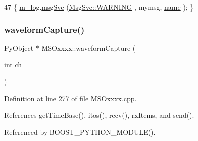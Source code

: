 \begin{DoxyCode}
47 \{ \hyperlink{classObject_a0d269813dd7ac1f24bc143031e2963f2}{m\_log}.\hyperlink{classMsgSvc_ad25f18047920cc59a314e5098259711c}{msgSvc} (\hyperlink{classMsgSvc_ae671eb7301996cd049d2da8a65925926a7cefae88f2ba26b2b05b676a383c834b}{MsgSvc::WARNING} , mymsg, \hyperlink{classObject_a300f4c05dd468c7bb8b3c968868443c1}{name} ); \}
\end{DoxyCode}
\mbox{\label{classMSOxxxx_aed78c680bcec9e14a88eedf7b291518c}} 
\subsubsection{\texorpdfstring{waveform\+Capture()}{waveformCapture()}}
{\footnotesize\ttfamily Py\+Object $\ast$ M\+S\+Oxxxx\+::waveform\+Capture (\begin{DoxyParamCaption}\item[{int}]{ch }\end{DoxyParamCaption})}



Definition at line 277 of file M\+S\+Oxxxx.\+cpp.



References get\+Time\+Base(), itos(), recv(), rx\+Items, and send().



Referenced by B\+O\+O\+S\+T\+\_\+\+P\+Y\+T\+H\+O\+N\+\_\+\+M\+O\+D\+U\+L\+E().


